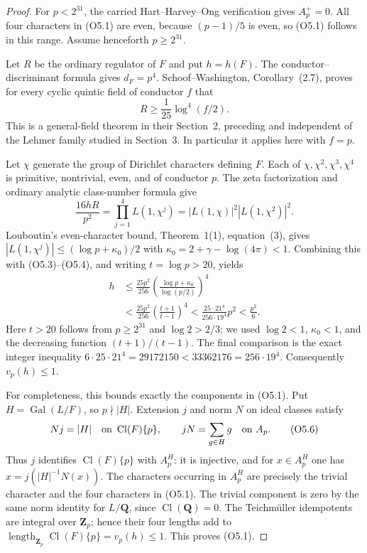 \begin{proof}
For $p<2^{31}$, the carried Hart--Harvey--Ong verification gives
$A_p^+=0$.  All four characters in (O5.1) are even, because
$(p-1)/5$ is even, so (O5.1) follows in this range.
Assume henceforth $p\ge2^{31}$.

Let $R$ be the ordinary regulator of $F$ and put $h=h(F)$.
The conductor--discriminant formula gives $d_F=p^4$.
Schoof--Washington, Corollary~(2.7), proves for every cyclic
quintic field of conductor $f$ that
\[
                        R\ge\frac1{25}\log^4(f/2).
                                                        \tag{O5.3}
\]
This is a general-field theorem in their Section~2, preceding
and independent of the Lehmer family studied in Section~3.
In particular it applies here with $f=p$.

Let $\chi$ generate the group of Dirichlet characters defining $F$.
Each of $\chi,\chi^2,\chi^3,\chi^4$ is primitive, nontrivial,
even, and of conductor $p$.  The zeta factorization and ordinary
analytic class-number formula give
\[
       \frac{16hR}{p^2}
         =\prod_{j=1}^4 L(1,\chi^j)
         =|L(1,\chi)|^2|L(1,\chi^2)|^2.         \tag{O5.4}
\]
Louboutin's even-character bound, Theorem~1(1), equation~(3), gives
$|L(1,\chi^j)|\le(\log p+\kappa_0)/2$ with
$\kappa_0=2+\gamma-\log(4\pi)<1$.
Combining this with (O5.3)--(O5.4), and writing $t=\log p>20$, yields
\[
 \begin{aligned}
 h&\le\frac{25p^2}{256}
       \left(\frac{\log p+\kappa_0}{\log(p/2)}\right)^4\\
  &<\frac{25p^2}{256}
       \left(\frac{t+1}{t-1}\right)^4
   <\frac{25\cdot21^4}{256\cdot19^4}p^2
   <\frac{p^2}{6}.
 \end{aligned}                                            \tag{O5.5}
\]
Here $t>20$ follows from $p\ge2^{31}$ and $\log2>2/3$;
we used $\log2<1$, $\kappa_0<1$, and the decreasing function
$(t+1)/(t-1)$.  The final comparison is the exact integer inequality
$6\cdot25\cdot21^4=29172150<33362176=256\cdot19^4$.
Consequently $v_p(h)\le1$.

For completeness, this bounds exactly the components in (O5.1).
Put $H=\operatorname{Gal}(L/F)$, so $p\nmid |H|$.
Extension $j$ and norm $N$ on ideal classes satisfy
\[
 Nj=|H|\quad\hbox{on }\operatorname{Cl}(F)\{p\},
 \qquad
 jN=\sum_{g\in H}g\quad\hbox{on }A_p.
                                                        \tag{O5.6}
\]
Thus $j$ identifies $\operatorname{Cl}(F)\{p\}$ with $A_p^H$:
it is injective, and for $x\in A_p^H$ one has
$x=j(|H|^{-1}N(x))$.
The characters occurring in $A_p^H$ are precisely the trivial
character and the four characters in (O5.1).
The trivial component is zero by the same norm identity for
$L/\mathbf Q$, since $\operatorname{Cl}(\mathbf Q)=0$.
The Teichm\"uller idempotents are integral over $\mathbf Z_p$;
hence their four lengths add to
$\operatorname{length}_{\mathbf Z_p}\operatorname{Cl}(F)\{p\}
=v_p(h)\le1$.  This proves (O5.1).
\end{proof}

